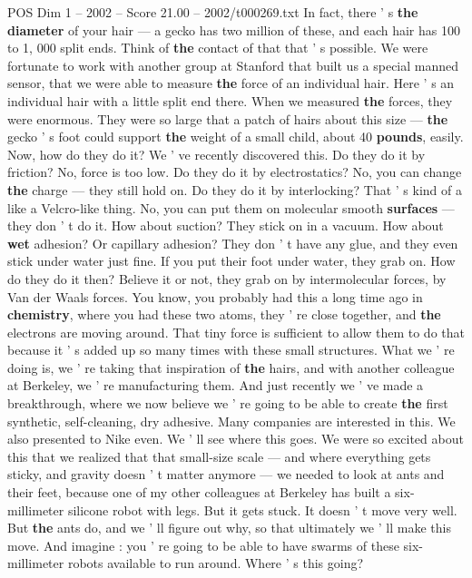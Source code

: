 \begin{textsample}{POS Dim 1 – 2002 – Score 21.00 – 2002/t000269.txt}
In fact, there ' s \textbf{the} \textbf{diameter} of your hair — a gecko has two million of these, and each hair has 100 to 1, 000 split ends.
Think of \textbf{the} contact of that that ' s possible.
We were fortunate to work with another group at Stanford that built us a special manned sensor, that we were able to measure \textbf{the} force of an individual hair.
Here ' s an individual hair with a little split end there.
When we measured \textbf{the} forces, they were enormous.
They were so large that a patch of hairs about this size — \textbf{the} gecko ' s foot could support \textbf{the} weight of a small child, about 40 \textbf{pounds}, easily.
Now, how do they do it?
We ' ve recently discovered this.
Do they do it by friction?
No, force is too low.
Do they do it by electrostatics?
No, you can change \textbf{the} charge — they still hold on.
Do they do it by interlocking?
That ' s kind of a like a Velcro-like thing.
No, you can put them on molecular smooth \textbf{surfaces} — they don ' t do it.
How about suction?
They stick on in a vacuum.
How about \textbf{wet} adhesion?
Or capillary adhesion?
They don ' t have any glue, and they even stick under water just fine.
If you put their foot under water, they grab on.
How do they do it then?
Believe it or not, they grab on by intermolecular forces, by Van der Waals forces.
You know, you probably had this a long time ago in \textbf{chemistry}, where you had these two atoms, they ' re close together, and \textbf{the} electrons are moving around.
That tiny force is sufficient to allow them to do that because it ' s added up so many times with these small structures.
What we ' re doing is, we ' re taking that inspiration of \textbf{the} hairs, and with another colleague at Berkeley, we ' re manufacturing them.
And just recently we ' ve made a breakthrough, where we now believe we ' re going to be able to create \textbf{the} first synthetic, self-cleaning, dry adhesive.
Many companies are interested in this.
We also presented to Nike even.
We ' ll see where this goes.
We were so excited about this that we realized that that small-size scale — and where everything gets sticky, and gravity doesn ' t matter anymore — we needed to look at ants and their feet, because one of my other colleagues at Berkeley has built a six-millimeter silicone robot with legs.
But it gets stuck.
It doesn ' t move very well.
But \textbf{the} ants do, and we ' ll figure out why, so that ultimately we ' ll make this move.
And imagine : you ' re going to be able to have swarms of these six-millimeter robots available to run around.
Where ' s this going?

\end{textsample}
